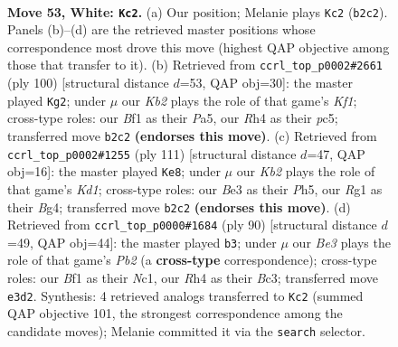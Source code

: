 \documentclass[11pt]{article}
\begin{document}
\clearpage

\begin{figure}[p]\centering
\begin{subfigure}{0.46\textwidth}\centering
\resizebox{\linewidth}{!}{%
\newchessgame
\chessboard[
  setfen={4n3/p1p1k3/8/5p2/r4P1R/4B3/1K5P/3r1BR1 w - - 10 53},
  showmover=false,
  pgfstyle=straightmove, color=movearrow, markmove={b2-c2}
]}
\caption{}
\end{subfigure}\hfill
\begin{subfigure}{0.46\textwidth}\centering
\resizebox{\linewidth}{!}{%
\newchessgame
\chessboard[
  setfen={8/4k3/r2p4/P1pPn1p1/4B2r/R7/5P2/4RK2 w - - 7 51},
  showmover=false,
  pgfstyle=straightmove, color=movearrow, markmove={f1-g2}
]}
\caption{}
\end{subfigure}
\\[4pt]
\begin{subfigure}{0.46\textwidth}\centering
\resizebox{\linewidth}{!}{%
\newchessgame
\chessboard[
  setfen={3k4/8/2P2R2/7p/1N4bP/2K2pP1/5r2/8 b - - 2 56},
  showmover=false,
  pgfstyle=straightmove, color=movearrow, markmove={d8-e8}
]}
\caption{}
\end{subfigure}\hfill
\begin{subfigure}{0.46\textwidth}\centering
\resizebox{\linewidth}{!}{%
\newchessgame
\chessboard[
  setfen={3r4/6p1/2p2pk1/8/p7/2B2P2/1P5P/r1N1R2K w - - 2 46},
  showmover=false,
  pgfstyle=straightmove, color=movearrow, markmove={b2-b3}
]}
\caption{}
\end{subfigure}
\caption{\textbf{Move 53, White: \texttt{Kc2}.} (a) Our position; Melanie plays \texttt{Kc2} (\texttt{b2c2}). Panels (b)--(d) are the retrieved master positions whose correspondence most drove this move (highest QAP objective among those that transfer to it). (b) Retrieved from \texttt{ccrl\_top\_p0002\#2661} (ply 100) [structural distance $d$=53, QAP obj=30]: the master played \texttt{Kg2}; under $\mu$ our \emph{Kb2} plays the role of that game's \emph{Kf1}; cross-type roles: our \emph{B}f1 as their \emph{P}a5, our \emph{R}h4 as their \emph{p}c5; transferred move \texttt{b2c2} \textbf{(endorses this move)}. (c) Retrieved from \texttt{ccrl\_top\_p0002\#1255} (ply 111) [structural distance $d$=47, QAP obj=16]: the master played \texttt{Ke8}; under $\mu$ our \emph{Kb2} plays the role of that game's \emph{Kd1}; cross-type roles: our \emph{B}e3 as their \emph{P}h5, our \emph{R}g1 as their \emph{B}g4; transferred move \texttt{b2c2} \textbf{(endorses this move)}. (d) Retrieved from \texttt{ccrl\_top\_p0000\#1684} (ply 90) [structural distance $d$=49, QAP obj=44]: the master played \texttt{b3}; under $\mu$ our \emph{Be3} plays the role of that game's \emph{Pb2} (a \textbf{cross-type} correspondence); cross-type roles: our \emph{B}f1 as their \emph{N}c1, our \emph{R}h4 as their \emph{B}c3; transferred move \texttt{e3d2}. Synthesis: 4 retrieved analogs transferred to \texttt{Kc2} (summed QAP objective 101, the strongest correspondence among the candidate moves); Melanie committed it via the \texttt{search} selector.}
\label{fig:thought-m104}
\end{figure}
\end{document}
